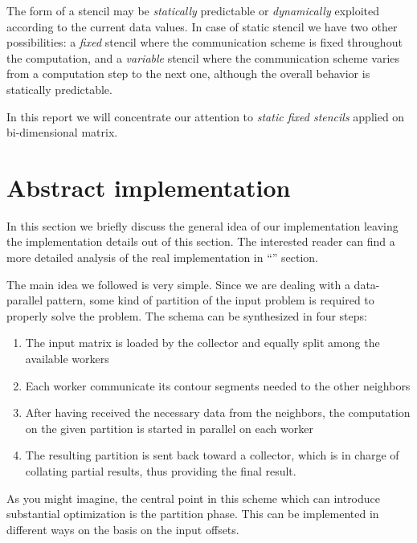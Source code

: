 The form of a stencil may be \emph{statically} predictable or
\emph{dynamically} exploited according to the current data values. In
case of static stencil we have two other possibilities: a \emph{fixed}
stencil where the communication scheme is fixed throughout the
computation, and a \emph{variable} stencil where the communication
scheme varies from a computation step to the next one, although the
overall behavior is statically predictable.

In this report we will concentrate our attention to \emph{static fixed
stencils} applied on bi-dimensional matrix.

\section{Abstract implementation}\label{sec:abstract-impl}

In this section we briefly discuss the general idea of our
implementation leaving the implementation details out of this section.
The interested reader can find a more detailed analysis of the real
implementation in ``'' section.

The main idea we followed is very simple. Since we are dealing with a
data-parallel pattern, some kind of partition of the input problem is
required to properly solve the problem. The schema can be synthesized in
four steps:

\begin{enumerate}
  \item The input matrix is loaded by the collector and equally split
    among the available workers
  \item Each worker communicate its contour segments needed to the other
    neighbors
  \item After having received the necessary data from the neighbors, the
    computation on the given partition is started in parallel on each
    worker
  \item The resulting partition is sent back toward a collector, which
    is in charge of collating partial results, thus providing the final
    result.
\end{enumerate}

As you might imagine, the central point in this scheme which can
introduce substantial optimization is the partition phase. This can be
implemented in different ways on the basis on the input offsets.

